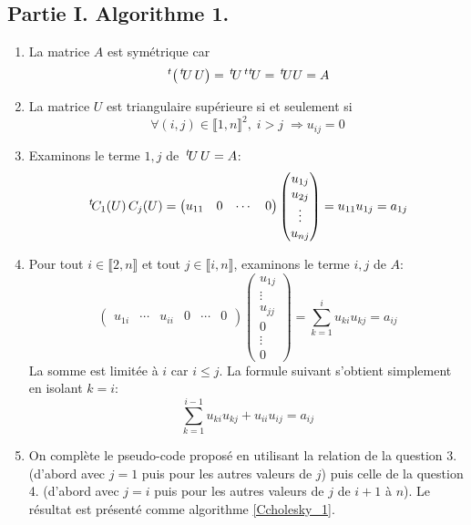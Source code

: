 \subsection*{Partie I. Algorithme 1.}
\begin{enumerate}
 \item La matrice $A$ est symétrique car 
 \begin{displaymath}
  \,\mathstrut^t\! \left( \,\mathstrut^t\! U \, U\right) = \,\mathstrut^t\! U \,\mathstrut^t\! \,\mathstrut^t\! U = \,\mathstrut^t\! U U = A 
 \end{displaymath}

 \item La matrice $U$ est triangulaire supérieure si et seulement si
 \begin{displaymath}
 \forall (i,j)\in \llbracket 1,n \rrbracket^2, \; i > j\; \Rightarrow u_{i j} = 0 
\end{displaymath}

 \item Examinons le terme $1, j$ de $\,\mathstrut^t\! U \, U = A$:
\begin{displaymath}
\,\mathstrut^t\! C_1(U)\, C_j(U) =
\begin{pmatrix}
 u_{1 1} & 0 & \cdots & 0
\end{pmatrix}
\begin{pmatrix}
 u_{1 j} \\ u_{2 j} \\ \vdots \\ u_{n j}
\end{pmatrix}
 = u_{1 1} u_{1 j} = a_{1 j}
\end{displaymath}

 \item Pour tout $i\in \llbracket 2,n \rrbracket$ et tout $j\in \llbracket i,n \rrbracket$, examinons le terme $i, j$ de $A$:
\begin{displaymath}
\begin{pmatrix}
 u_{1 i} & \cdots & u_{i i} & 0 & \cdots & 0
\end{pmatrix}
\begin{pmatrix}
 u_{1 j} \\ \vdots \\ u_{j j} \\0 \\ \vdots \\ 0
\end{pmatrix} 
 = \sum_{k=1}^{i}u_{k i} u_{k j} = a_{i j}
\end{displaymath}
La somme est limitée à $i$ car $i\leq j$. La formule suivant s'obtient simplement en isolant $k=i$:
\begin{displaymath}
 \sum_{k=1}^{i-1}u_{k i} u_{k j} + u_{i i} u_{i j} = a_{i j}
\end{displaymath}

 \item On complète le pseudo-code proposé en utilisant la relation de la question 3. (d'abord avec $j=1$ puis pour les autres valeurs de $j$) puis celle de la question 4. (d'abord avec $j=i$ puis pour les autres valeurs de $j$ de $i+1$ à $n$). Le résultat est présenté comme algorithme \ref{Ccholesky_1}.
\end{enumerate}
